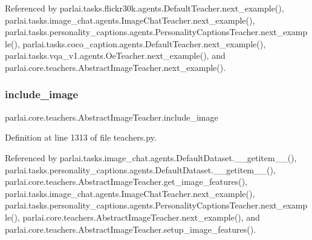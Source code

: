 Referenced by parlai.\+tasks.\+flickr30k.\+agents.\+Default\+Teacher.\+next\+\_\+example(), parlai.\+tasks.\+image\+\_\+chat.\+agents.\+Image\+Chat\+Teacher.\+next\+\_\+example(), parlai.\+tasks.\+personality\+\_\+captions.\+agents.\+Personality\+Captions\+Teacher.\+next\+\_\+example(), parlai.\+tasks.\+coco\+\_\+caption.\+agents.\+Default\+Teacher.\+next\+\_\+example(), parlai.\+tasks.\+vqa\+\_\+v1.\+agents.\+Oe\+Teacher.\+next\+\_\+example(), and parlai.\+core.\+teachers.\+Abstract\+Image\+Teacher.\+next\+\_\+example().

\mbox{\label{classparlai_1_1core_1_1teachers_1_1AbstractImageTeacher_a0e4ee3692e19e0f1df2fef8f21d058ab}} 
\subsubsection{\texorpdfstring{include\+\_\+image}{include\_image}}
{\footnotesize\ttfamily parlai.\+core.\+teachers.\+Abstract\+Image\+Teacher.\+include\+\_\+image}



Definition at line 1313 of file teachers.\+py.



Referenced by parlai.\+tasks.\+image\+\_\+chat.\+agents.\+Default\+Dataset.\+\_\+\+\_\+getitem\+\_\+\+\_\+(), parlai.\+tasks.\+personality\+\_\+captions.\+agents.\+Default\+Dataset.\+\_\+\+\_\+getitem\+\_\+\+\_\+(), parlai.\+core.\+teachers.\+Abstract\+Image\+Teacher.\+get\+\_\+image\+\_\+features(), parlai.\+tasks.\+image\+\_\+chat.\+agents.\+Image\+Chat\+Teacher.\+next\+\_\+example(), parlai.\+tasks.\+personality\+\_\+captions.\+agents.\+Personality\+Captions\+Teacher.\+next\+\_\+example(), parlai.\+core.\+teachers.\+Abstract\+Image\+Teacher.\+next\+\_\+example(), and parlai.\+core.\+teachers.\+Abstract\+Image\+Teacher.\+setup\+\_\+image\+\_\+features().

\mbox{\label{classparlai_1_1core_1_1teachers_1_1AbstractImageTeacher_aa7ca0df94cb27a11487e40343cc84de6}} 
